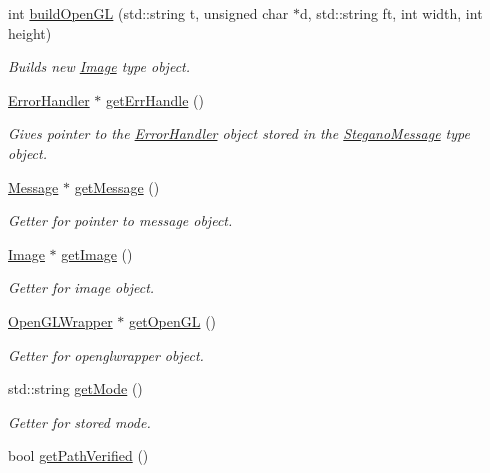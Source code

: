 \begin{DoxyCompactItemize}
int \mbox{\hyperlink{classSteganoMessage_ae7b73b51fe38826625497a3bfef2bf42}{build\+Open\+GL}} (std\+::string t, unsigned char $\ast$d, std\+::string ft, int width, int height)
\begin{DoxyCompactList}\small\item\em Builds new \mbox{\hyperlink{classImage}{Image}} type object. \end{DoxyCompactList}\item 
\mbox{\hyperlink{classErrorHandler}{Error\+Handler}} $\ast$ \mbox{\hyperlink{classSteganoMessage_a0134757a8c79caa9dca9bcce0686d1ef}{get\+Err\+Handle}} ()
\begin{DoxyCompactList}\small\item\em Gives pointer to the \mbox{\hyperlink{classErrorHandler}{Error\+Handler}} object stored in the \mbox{\hyperlink{classSteganoMessage}{Stegano\+Message}} type object. \end{DoxyCompactList}\item 
\mbox{\hyperlink{classMessage}{Message}} $\ast$ \mbox{\hyperlink{classSteganoMessage_ad29978e925056ad70dc5c45b1e1681eb}{get\+Message}} ()
\begin{DoxyCompactList}\small\item\em Getter for pointer to message object. \end{DoxyCompactList}\item 
\mbox{\hyperlink{classImage}{Image}} $\ast$ \mbox{\hyperlink{classSteganoMessage_a2e3ad705a0219edfd2150f3f7931979c}{get\+Image}} ()
\begin{DoxyCompactList}\small\item\em Getter for image object. \end{DoxyCompactList}\item 
\mbox{\hyperlink{classOpenGLWrapper}{Open\+G\+L\+Wrapper}} $\ast$ \mbox{\hyperlink{classSteganoMessage_a23e0b48ee048e07488f06818bfd5a466}{get\+Open\+GL}} ()
\begin{DoxyCompactList}\small\item\em Getter for openglwrapper object. \end{DoxyCompactList}\item 
std\+::string \mbox{\hyperlink{classSteganoMessage_a7dc660e6d2c8f162636f789cfedde67e}{get\+Mode}} ()
\begin{DoxyCompactList}\small\item\em Getter for stored mode. \end{DoxyCompactList}\item 
bool \mbox{\hyperlink{classSteganoMessage_ace172144e49a4da69b890958b3b8089b}{get\+Path\+Verified}} ()

\end{DoxyCompactItemize}
